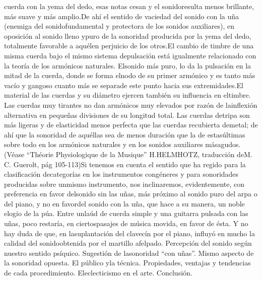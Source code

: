 \documentclass[
11pt, %
a4paper, %
oneside, %
headinclude,footinclude, %
BCOR5mm, %
]{scrartcl}
\begin{document}
{cuerda con la yema del dedo, esas notas cesan y el sonidoresulta menos brillante, más suave y más amplio.De ahí el sentido de vaciedad del sonido con la uña (enemiga del sonidofundamental y protectora de los sonidos auxiliares), en oposición al sonido lleno ypuro de la sonoridad producida por la yema del dedo, totalmente favorable a aquélen perjuicio de los otros.El cambio de timbre de una misma cuerda bajo el mismo sistema depulsación está igualmente relacionado con la teoría de los armónicos naturales. Elsonido más puro, lo da la pulsación en la mitad de la cuerda, donde se forma elnodo de su primer armónico y es tanto más vacío y gangoso cuanto más se separade este punto hacia sus extremidades.El material de las cuerdas y su diámetro ejercen también su influencia en eltimbre. Las cuerdas muy tirantes no dan armónicos muy elevados por razón de lainflexión alternativa en pequeñas divisiones de su longitud total. Las cuerdas detripa son más ligeras y de elasticidad menos perfecta que las cuerdas recubierta demetal; de ahí que la sonoridad de aquéllas sea de menos duración que la de estasúltimas sobre todo en los armónicos naturales y en los sonidos auxiliares másagudos. (Véase “Théorie Physiologique de la Musique” H.HELMHOTZ, traducción deM. C. Guerolt, pág 105-113)Si tenemos en cuenta el sentido que ha regido para la clasificación decategorías en los instrumentos congéneres y para sonoridades producidas sobre unmismo instrumento, nos inclinaremos, evidentemente, con preferencia en favor delsonido sin las uñas, más próximo al sonido puro del arpa o del piano, y no en favordel sonido con la uña, que hace a su manera, un noble elogio de la púa. Entre unlaúd de cuerda simple y una guitarra pulsada con las uñas, poco restaría, en ciertospasajes de música movida, en favor de ésta. Y no hay duda de que, en lasuplantación del clavecín por el piano, influyó en mucho la calidad del sonidoobtenida por el martillo afelpado. Percepción del sonido según nuestro sentido psíquico. Sugestión de lasonoridad “con uñas”. Mismo aspecto de la sonoridad opuesta. El público yla técnica. Propiedades, ventajas y tendencias de cada procedimiento. Eleclecticismo en el arte. Conclusión.
}
\end{document}
